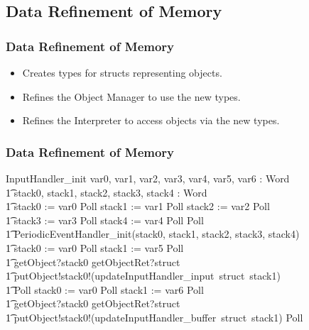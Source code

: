 \documentclass{beamer}
\begin{document}
\subsection{Data Refinement of Memory}

\begin{frame}
  \frametitle{Data Refinement of Memory}
  \begin{itemize}
  \item Creates types for structs representing objects.
  \item Refines the Object Manager to use the new types.
  \item Refines the Interpreter to access objects via the new types.
  \end{itemize}
\end{frame}

\begin{frame}[shrink]
  \frametitle{Data Refinement of Memory}
  \setlength{\zedleftsep}{0cm}
  \setlength{\zedindent}{0cm}
  \begin{circus}
    InputHandler\_init \circdef \circval var0, var1, var2, var3, var4, var5, var6 : Word  \circspot \\
    \t1 \circvar stack0, stack1, stack2, stack3, stack4 : Word \circspot \\
    \t1 stack0 := var0 \circseq Poll \circseq stack1 := var1 \circseq Poll \circseq stack2 := var2 \circseq Poll \circseq \\
    \t1 stack3 := var3 \circseq Poll \circseq stack4 := var4 \circseq Poll \circseq Poll \circseq \\
    \t1 PeriodicEventHandler\_init(stack0, stack1, stack2, stack3, stack4) \circseq \\
    \t1 stack0 := var0 \circseq Poll \circseq stack1 := var5 \circseq Poll \circseq \\
    \t1 {\color{red} getObject?stack0 \then getObjectRet?struct \then {}} \\
    \t1 {\color{red} putObject!stack0!(updateInputHandler\_input~struct~stack1)  \then {}  \Skip} \circseq \\
    \t1 Poll \circseq stack0 := var0 \circseq Poll \circseq stack1 := var6 \circseq Poll \circseq \\
    \t1 {\color{red} getObject?stack0 \then getObjectRet?struct \then {}} \\
    \t1 {\color{red} putObject!stack0!(updateInputHandler\_buffer~struct~stack1) \then \Skip} \circseq Poll
  \end{circus}
  \begin{circus}

\end{circus}
\end{frame}
\end{document}
